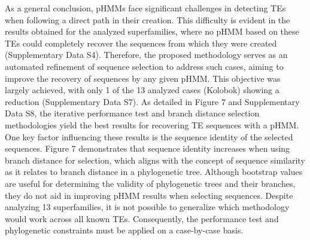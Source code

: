 \documentclass[unnumsec,webpdf,contemporary,large]{oup-authoring-template}%
\theoremstyle{thmstyleone}%
\theoremstyle{thmstyletwo}%
\theoremstyle{thmstylethree}%
\begin{document}
As a general conclusion, pHMMs face significant challenges in detecting TEs when following a direct path in their creation. This difficulty is evident in the results obtained for the analyzed superfamilies, where no pHMM based on these TEs could completely recover the sequences from which they were created (Supplementary Data S4). Therefore, the proposed methodology serves as an automated refinement of sequence selection to address such cases, aiming to improve the recovery of sequences by any given pHMM. This objective was largely achieved, with only 1 of the 13 analyzed cases (Kolobok) showing a reduction (Supplementary Data S7). As detailed in Figure 7 and Supplementary Data S8, the iterative performance test and branch distance selection methodologies yield the best results for recovering TE sequences with a pHMM. One key factor influencing these results is the sequence identity of the selected sequences. Figure 7 demonstrates that sequence identity increases when using branch distance for selection, which aligns with the concept of sequence similarity as it relates to branch distance in a phylogenetic tree. Although bootstrap values are useful for determining the validity of phylogenetic trees and their branches, they do not aid in improving pHMM results when selecting sequences. Despite analyzing 13 superfamilies, it is not possible to generalize which methodology would work across all known TEs. Consequently, the performance test and phylogenetic constraints must be applied on a case-by-case basis.
\end{document}
